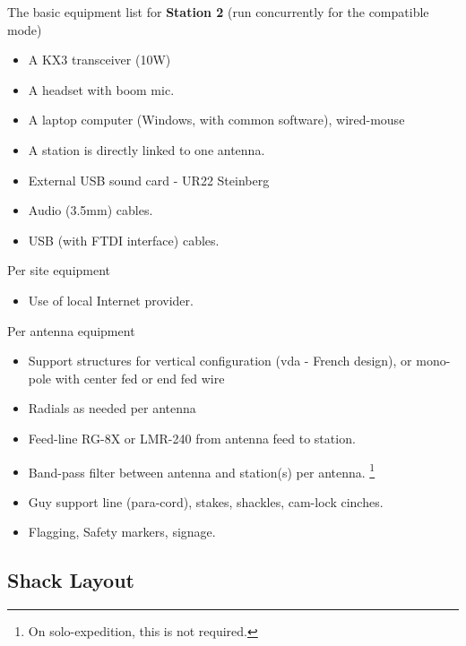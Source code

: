 \documentclass[11pt]{article}
\begin{document}
The basic equipment list for {\textbf{Station 2}} (run concurrently
for the compatible mode)
\begin{itemize}
\item A KX3 transceiver (10W)
\item A headset with boom mic.
\item A laptop computer (Windows, with common software), wired-mouse
\item A station is directly linked to one antenna.
\item External USB sound card - UR22 Steinberg
\item Audio (3.5mm) cables. 
\item USB (with FTDI interface) cables.
\end{itemize}

Per site equipment
\begin{itemize}
\item Use of local Internet provider.
\end{itemize}

Per antenna equipment
\begin{itemize}
\item Support structures for vertical configuration ({\gls{vda}} - French design),
or mono-pole with center fed or end fed wire
\item Radials as needed per antenna
\item Feed-line RG-8X or LMR-240 from antenna feed to station.
\item Band-pass filter between antenna and station(s) per antenna.
\footnote{On solo-expedition, this is not required.}
\item Guy support line (para-cord), stakes, shackles, cam-lock cinches.
\item Flagging, Safety markers, signage.
\end{itemize}

\subsection{Shack Layout}
\end{document}

